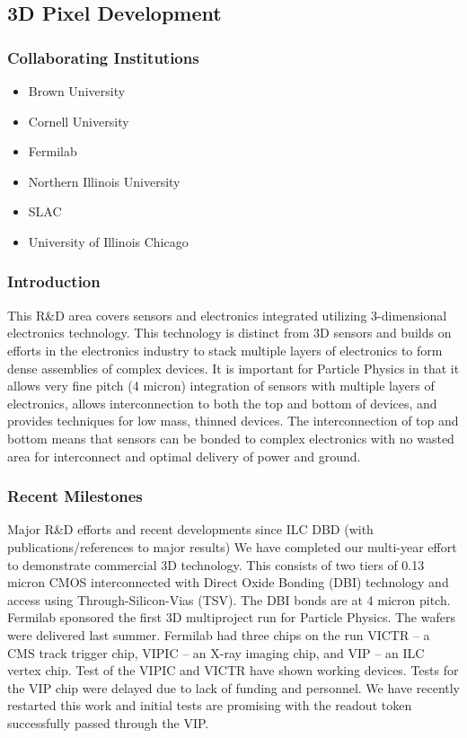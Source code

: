 \subsection{3D Pixel Development}
\subsubsection{Collaborating Institutions}
\begin{itemize}
\item Brown University
\item Cornell University
\item Fermilab
\item Northern Illinois University
\item SLAC
\item University of Illinois Chicago
\end{itemize}
\subsubsection{Introduction}
This R\&D area covers sensors and electronics integrated utilizing 3-dimensional electronics technology.  This technology is distinct from 3D sensors and builds on efforts in the electronics industry to stack multiple layers of electronics to form dense assemblies of complex devices.  It is important for Particle Physics in that it allows very fine pitch (4 micron) integration of sensors with multiple layers of electronics, allows interconnection to both the top and bottom of devices, and provides techniques for low mass, thinned devices. The interconnection of top and bottom means that sensors can be bonded to complex electronics with no wasted area for interconnect and optimal delivery of power and ground.
\subsubsection{Recent Milestones}
Major R\&D efforts and recent developments since ILC DBD (with publications/references to major results)
We have completed our multi-year effort to demonstrate commercial 3D technology. This consists of two tiers of 0.13 micron CMOS interconnected with Direct Oxide Bonding (DBI) technology and access using Through-Silicon-Vias (TSV). The DBI bonds are at 4 micron pitch. Fermilab sponsored the first 3D multiproject run for Particle Physics.  The wafers were delivered last summer. Fermilab had three chips on the run VICTR – a CMS track trigger chip, VIPIC – an X-ray imaging chip, and VIP – an ILC vertex chip. Test of the VIPIC and VICTR have shown working devices.  Tests for the VIP chip were delayed due to lack of funding and personnel.  We have recently restarted this work and initial tests are promising with the readout token successfully passed through the VIP.

